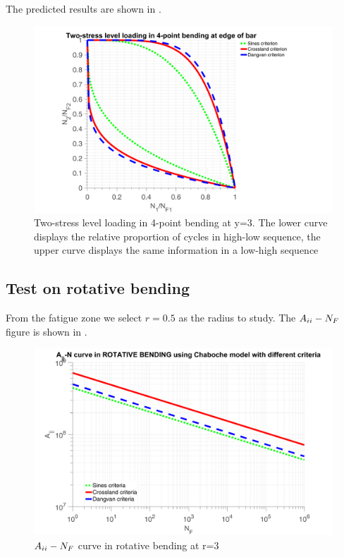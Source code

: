 The predicted results are shown in .

\begin{figure}[!h]
	\centering
	\includegraphics[width=\textwidth]{figures//2stressB.png} 
	\caption{Two-stress level loading in 4-point bending at y=3. The lower curve displays the relative proportion of cycles in high-low sequence, the upper curve displays the same information in a low-high sequence}
	\label{2stressB}
\end{figure}

\newpage
\subsection{Test on rotative bending}
From the fatigue zone we select $r=0.5$ as the radius to study. 
The $A_{\uppercase\expandafter{\romannumeral2}}-N_F$ figure is shown in .

\begin{figure}[!h]
	\centering
	\includegraphics[width=\textwidth]{figures//JNRB.png} 
	\caption{$A_{\uppercase\expandafter{\romannumeral2}}-N_F$ curve in rotative bending at r=3}
	\label{JNRB}
\end{figure}

